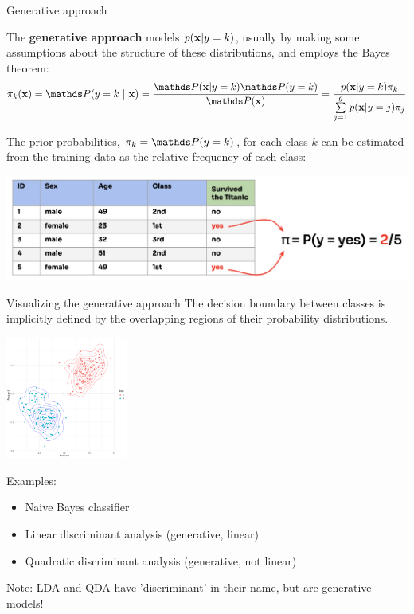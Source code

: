 \documentclass[11pt,compress,t,notes=noshow, xcolor=table]{beamer}
\begin{document}
\begin{vbframe}{Generative approach}

The \textbf{generative approach}
models $p(\mathbf{x} | y= k)$, usually by making some assumptions about the structure of these distributions, and employs the Bayes theorem:
$$\pikx = \postk = \frac{\P(\xv | y = k) \P(y = k)}{\P(\xv)} = \frac{\pdfxyk \pik}{\sumjg \pdfxyk[j] \pi_j}$$

The prior probabilities, $\pi_k = \P(y = k)$, for each class $k$ can be estimated from the training data as the relative frequency of each class:

\begin{center}
\includegraphics{figure_man/prior_probabilities.png} 
\end{center}

\end{vbframe}

\begin{vbframe}{Visualizing the generative approach}
The decision boundary between classes is implicitly defined by the overlapping regions of their probability distributions.

\begin{center}
\includegraphics[width=0.3\textwidth]{figure/approach_generative.png} 
\end{center}

\small{
Examples:
\begin{itemize}
\item Naive Bayes classifier
\item Linear discriminant analysis (generative, linear)
\item Quadratic discriminant analysis (generative, not linear)
\end{itemize}
}

{\footnotesize Note: LDA and QDA have 'discriminant' in their name, but are generative models!}
\end{vbframe}
\end{document}
